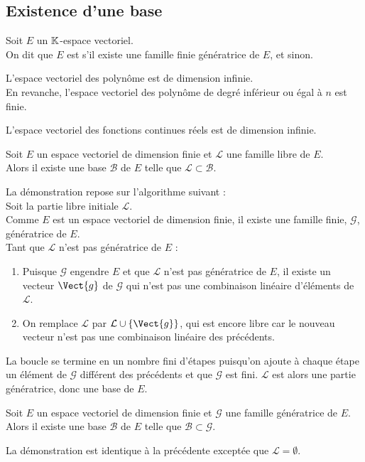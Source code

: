 \documentclass{book}
\begin{document}
\subsection{Existence d'une base}
\begin{Definition}
Soit $E$ un $\mathbb{K} $-espace vectoriel.\\
On dit que $E$ est  s'il existe une famille finie génératrice de $E$,
et  sinon.
\end{Definition}
\begin{Exemple}
L'espace vectoriel des polynôme est de dimension infinie.\\
En revanche, l'espace vectoriel des polynôme de degré inférieur ou égal à $n$ est finie.
\end{Exemple}
\begin{Exemple}
L'espace vectoriel des fonctions continues réels est  de dimension infinie.
\end{Exemple}

\begin{Theoreme}
Soit $E$ un espace vectoriel de dimension finie et $\mathcal{L}$ une famille libre de $E$.\\  
Alors il existe une base $\mathcal{B}$ de $E$ telle que $\mathcal{L}\subset \mathcal{B}$.
\end{Theoreme}
\begin{Demonstration}
La démonstration  repose sur l'algorithme suivant :\\
Soit la partie libre initiale $\mathcal{L}$.\\
Comme $E$ est un espace vectoriel de dimension finie, il existe une famille finie, $\mathcal{G}$, génératrice de $E$.\\
Tant que $\mathcal{L}$ n'est pas génératrice de $E$ :
\begin{enumerate}
\item Puisque $\mathcal{G}$ engendre $E$ et que $\mathcal{L}$ n'est pas génératrice de $E$, il existe un vecteur $\Vect{g}$ de $\mathcal{G}$ qui n'est pas une combinaison linéaire d'éléments de $\mathcal{L}$.
\item On remplace $\mathcal{L}$ par $\mathcal{L}\cup \{\Vect{g} \}$, qui est encore libre car le nouveau vecteur n'est pas une combinaison linéaire des précédents.
\end{enumerate}
La boucle se termine en un nombre fini d'étapes puisqu'on ajoute à chaque étape un élément de $\mathcal{G}$ différent des précédents et que $\mathcal{G}$ est fini. $\mathcal{L}$ est alors une partie génératrice, donc une base de $E$.
\end{Demonstration}
\begin{Theoreme}
Soit $E$ un espace vectoriel de dimension finie et $\mathcal{G}$ une famille génératrice de $E$. \\ 
Alors il existe une base $\mathcal{B}$ de $E$ telle que $\mathcal{B}\subset \mathcal{G}.$
\end{Theoreme}
\begin{Demonstration}
La démonstration est identique à la précédente exceptée que $\mathcal{L}=\emptyset$.
\end{Demonstration}
\end{document}
